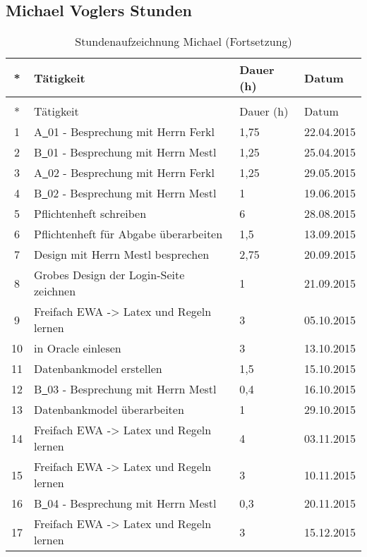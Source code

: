 \subsection{Michael Voglers Stunden}
\begin{longtable}[h]{| c | p{11.6cm} | l | l |}
\caption{Stundenaufzeichnung Michael}\label{tab:stundenaufzeichnung_michael}\\ 
\toprule
* & Tätigkeit & Dauer (h) & Datum \\
\midrule
\endfirsthead
\caption[]{Stundenaufzeichnung Michael \small(Fortsetzung)}\\
\toprule
* & Tätigkeit & Dauer (h) & Datum \\
\midrule
\endhead
\midrule
\endfoot 
\bottomrule
\endlastfoot 
\hline

1 & A\underline{\ }01 - Besprechung mit Herrn Ferkl & 1,75 & 22.04.2015 \\ \hline
2 & B\underline{\ }01 - Besprechung mit Herrn Mestl & 1,25 & 25.04.2015 \\ \hline
3 & A\underline{\ }02 - Besprechung mit Herrn Ferkl & 1,25 & 29.05.2015 \\ \hline
4 & B\underline{\ }02 - Besprechung mit Herrn Mestl & 1 & 19.06.2015 \\ \hline
5 & Pflichtenheft schreiben & 6 & 28.08.2015 \\ \hline
6 & Pflichtenheft für Abgabe überarbeiten & 1,5 & 13.09.2015 \\ \hline
7 & Design mit Herrn Mestl besprechen & 2,75 & 20.09.2015 \\ \hline
8 & Grobes Design der Login-Seite zeichnen & 1 & 21.09.2015 \\ \hline
9 & Freifach EWA -> Latex und Regeln lernen & 3 & 05.10.2015 \\ \hline
10 & in Oracle einlesen & 3 & 13.10.2015 \\ \hline
11 & Datenbankmodel erstellen & 1,5 & 15.10.2015 \\ \hline
12 & B\underline{\ }03 - Besprechung mit Herrn Mestl & 0,4 & 16.10.2015 \\ \hline
13 & Datenbankmodel überarbeiten & 1 & 29.10.2015 \\ \hline
14 & Freifach EWA -> Latex und Regeln lernen & 4 & 03.11.2015 \\ \hline
15 & Freifach EWA -> Latex und Regeln lernen & 3 & 10.11.2015 \\ \hline
16 & B\underline{\ }04 - Besprechung mit Herrn Mestl & 0,3 & 20.11.2015 \\ \hline
17 & Freifach EWA -> Latex und Regeln lernen & 3 & 15.12.2015 \\ \hline

\end{longtable}
